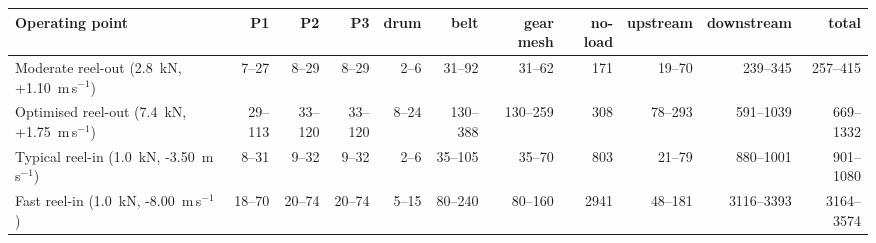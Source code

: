 \begin{tabular}{lrrrrrrrrrr}
\toprule
Operating point & P1 & P2 & P3 & drum & belt & gear mesh & no-load & upstream & downstream & total \\
\midrule
Moderate reel-out (2.8~kN, +1.10~m\,s$^{-1}$) & 7--27 & 8--29 & 8--29 & 2--6 & 31--92 & 31--62 & 171 & 19--70 & 239--345 & 257--415 \\
Optimised reel-out (7.4~kN, +1.75~m\,s$^{-1}$) & 29--113 & 33--120 & 33--120 & 8--24 & 130--388 & 130--259 & 308 & 78--293 & 591--1039 & 669--1332 \\
Typical reel-in (1.0~kN, -3.50~m\,s$^{-1}$) & 8--31 & 9--32 & 9--32 & 2--6 & 35--105 & 35--70 & 803 & 21--79 & 880--1001 & 901--1080 \\
Fast reel-in (1.0~kN, -8.00~m\,s$^{-1}$) & 18--70 & 20--74 & 20--74 & 5--15 & 80--240 & 80--160 & 2941 & 48--181 & 3116--3393 & 3164--3574 \\
\bottomrule
\end{tabular}
